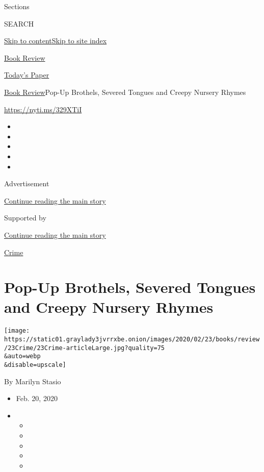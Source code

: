 Sections

SEARCH

\protect\hyperlink{site-content}{Skip to
content}\protect\hyperlink{site-index}{Skip to site index}

\href{https://www.nytimes3xbfgragh.onion/section/books/review}{Book
Review}

\href{https://myaccount.nytimes3xbfgragh.onion/auth/login?response_type=cookie\&client_id=vi}{}

\href{https://www.nytimes3xbfgragh.onion/section/todayspaper}{Today's
Paper}

\href{/section/books/review}{Book Review}\textbar{}Pop-Up Brothels,
Severed Tongues and Creepy Nursery Rhymes

\url{https://nyti.ms/329XTiI}

\begin{itemize}
\item
\item
\item
\item
\item
\end{itemize}

Advertisement

\protect\hyperlink{after-top}{Continue reading the main story}

Supported by

\protect\hyperlink{after-sponsor}{Continue reading the main story}

\href{/column/crime}{Crime}

\hypertarget{pop-up-brothels-severed-tongues-and-creepy-nursery-rhymes}{%
\section{Pop-Up Brothels, Severed Tongues and Creepy Nursery
Rhymes}\label{pop-up-brothels-severed-tongues-and-creepy-nursery-rhymes}}

\texttt{[image: https://static01.graylady3jvrrxbe.onion/images/2020/02/23/books/review/23Crime/23Crime-articleLarge.jpg?quality=75\\\&auto=webp\\\&disable=upscale]}

By Marilyn Stasio

\begin{itemize}
\item
  Feb. 20, 2020
\item
  \begin{itemize}
  \item
  \item
  \item
  \item
  \item
  \end{itemize}
\end{itemize}

